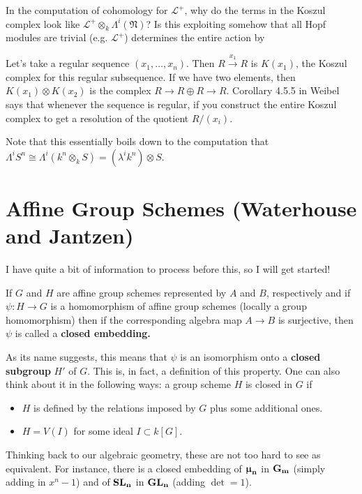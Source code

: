 \documentclass[12pt]{article}
\theoremstyle{nonumberbreak}
\theoremstyle{changebreak}
\theoremstyle{nonumberplain}
\theoremstyle{change}
\newcommand{\Gm}{\ensuremath\mathbf{G_m}}
\newcommand*{\GL}[1]{\ensuremath\mathbf{GL_#1}}
\newcommand*{\SL}[1]{\ensuremath\mathbf{SL_#1}}
\newcommand*{\mun}[1]{\ensuremath\mathbf{\bm\upmu_#1}}
\begin{document}
\begin{qst}
	In the computation of cohomology for $\mathcal L^+$, why do the terms in the Koszul complex
	look like $\mathcal L^+\otimes_k \Lambda^i(\mathfrak N)$? Is this exploiting somehow that 
	all Hopf modules are trivial (e.g. $\mathcal L^+$) determines the entire action by 
\end{qst}

Let's take a regular sequence $(x_1,\dots,x_n)$. Then $R\xrightarrow{x_1} R$ is $K(x_1)$, the 
Koszul complex for this regular subsequence. If we have two elements, then $K(x_1)\otimes K(x_2)$
is the complex $R\to R\oplus R\to R$. Corollary 4.5.5 in Weibel says that whenever the sequence is regular, if you 
construct the entire Koszul complex to get a resolution of the quotient $R/(x_i)$.

Note that this essentially boils down to the computation that $\Lambda^iS^n\cong \Lambda^i(k^n\otimes_k S)=(\lambda^i k^n)\otimes S$.


\newpage
\section{Affine Group Schemes (Waterhouse and Jantzen)}
I have quite a bit of information to process before this, so I will get started!
\begin{defn}
	If $G$ and $H$ are affine group schemes represented by $A$ and $B$, respectively and
	if $\psi:H\to G$ is a homomorphism of affine group schemes (locally a group homomorphism)
	then if the corresponding algebra map $A\to B$ is surjective, then $\psi$ is called
	a \textbf{closed embedding.}
\end{defn}

As its name suggests, this means that $\psi$ is an isomorphism onto a \textbf{closed subgroup}
$H'$ of $G$. This is, in fact, a definition of this property. One can also think about 
it in the following ways: a group scheme $H$ is closed in $G$ if
\begin{itemize}
	\item $H$ is defined by the relations imposed by $G$ plus some additional ones.
	\item $H=V(I)$ for some ideal $I\subset k[G]$. 
\end{itemize}
Thinking back to our algebraic geometry, these are not too hard to see as equivalent. 
For instance, there is a closed embedding of $\mun n$ in $\Gm$ (simply adding in $x^n-1$)
and of $\SL{n}$ in $\GL{n}$ (adding $\det = 1$).
\end{document}
